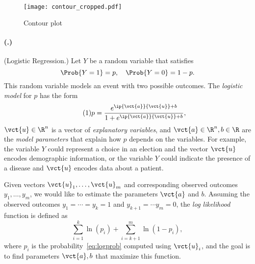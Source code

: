 \documentclass{article}
\newcounter{problemSheetNumber}
\newcounter{problems}
\renewcommand{\problem}{\paragraph{(\theproblemSheetNumber.\theproblems)}\addtocounter{problems}{1}}
\begin{document}
\begin{figure}[h!]
 \centering
 \texttt{[image: contour\_cropped.pdf]}
 \caption{Contour plot}\label{fig:contour}
\end{figure}

\problem (Logistic Regression.) Let $Y$ be a random variable that satisfies
 \begin{equation*}
  \Prob\{Y=1\} = p, \quad \Prob\{Y=0\} = 1-p.
 \end{equation*}
This random variable models an event with two possible outcomes. The {\em logistic model} for $p$ has the form
\begin{equation}\label{eq:logprob}\tag{1}
 p = \frac{e^{\ip{\vct{a}}{\vct{u}}+b}}{1+e^{\ip{\vct{a}}{\vct{u}}+b}},
\end{equation}
$\vct{u}\in \R^n$ is a vector of {\em explanatory variables}, and $\vct{a}\in \R^n, b\in \R$ are the {\em model parameters} that explain how $p$ depends on the variables. For example, the variable $Y$ could represent a choice in an election and the vector $\vct{u}$ encodes demographic information, or the variable $Y$ could indicate the presence of a disease and $\vct{u}$ encodes data about a patient.

Given vectors $\vct{u}_1,\dots,\vct{u}_m$ and corresponding observed outcomes $y_1,\dots,y_m$, we would like to estimate the parameters $\vct{a}$ and $b$. Assuming the observed outcomes $y_1=\cdots =y_k=1$ and $y_{k+1}=\cdots y_m=0$, the {\em log likelihood} function is defined as
\begin{equation}\label{eq:mlprod}\tag{2}
 \sum_{i=1}^k \ln(p_i) +\sum_{i=k+1}^m \ln(1-p_i),
\end{equation}
where $p_i$ is the probability~\eqref{eq:logprob} computed using $\vct{u}_i$,
and the goal is to find parameters $\vct{a},b$ that maximize this function.
\end{document}
